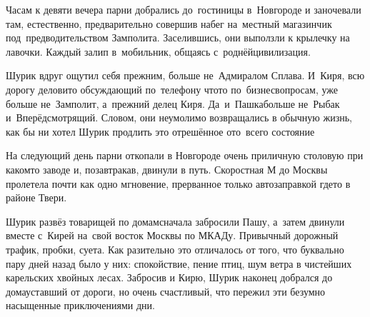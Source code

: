 \newpage

\myldots{}Часам к девяти вечера парни добрались до~гостиницы в~Новгороде и заночевали там, естественно, предварительно совершив набег на~местный магазинчик под~предводительством Замполита. Заселившись, они выползли к крылечку на лавочки. Каждый залип в~мобильник, общаясь с~роднёй\mdash цивилизация. 

Шурик вдруг ощутил себя прежним, больше не~Адмиралом Сплава. И~Киря, всю дорогу деловито обсуждающий по~телефону что\sdash то по~бизнес\sdash вопросам, уже больше не~Замполит, а~прежний делец Киря. Да~и~Пашка\mdash больше не~Рыбак и~Вперёдсмотрящий. Словом, они неумолимо возвращались в обычную жизнь, как бы ни хотел Шурик продлить это отрешённое ото~всего состояние\myldots{}

\myldots{}На следующий день парни откопали в Новгороде очень приличную столовую при каком\sdash то заводе и, позавтракав, двинули в путь. Скоростная М до Москвы пролетела почти как одно мгновение, прерванное только автозаправкой где\sdash то в районе Твери.

Шурик развёз товарищей по домам\mdash сначала забросили Пашу, а~затем двинули вместе с~Кирей на~свой восток Москвы по МКАДу. Привычный дорожный трафик, пробки, суета. Как разительно это отличалось от того, что буквально пару дней назад было у них: спокойствие, пение птиц, шум ветра в чистейших карельских хвойных лесах. Забросив и Кирю, Шурик наконец добрался до дома\mdash уставший от дороги, но очень счастливый, что пережил эти безумно насыщенные приключениями дни.





%
%
%
%
%



\begin{center}
\end{center}
